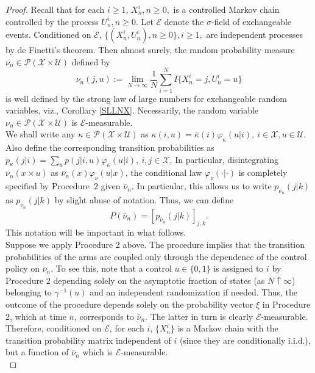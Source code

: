 \documentclass[10pt,a4paper]{amsart}
\newcommand{\E}{\mathcal{E}}
\newcommand{\PA}{\mathcal{P}}
\newcommand{\U}{\mathcal{U}}
\newcommand{\X}{\mathcal{X}}
\begin{document}
\begin{proof}
Recall that for each $i \geq 1$, $X^i_n, n \geq 0,$ is a controlled Markov chain controlled by the process $U^i_n, n \geq 0$.
Let $\E$ denote the $\sigma$-field of exchangeable events. Conditioned on $\E$,  $\{(X^i_n, U^i_n), n \geq 0\}, i \geq 1,$ are independent processes by de Finetti's theorem. Then almost surely,  the random probability measure $\nu_n \in \PA(\X\times\U)$ defined by
$$\nu_n(j,u) := \lim_{N\to\infty}\frac{1}{N}\sum_{i=1}^NI\{X^i_n=j, U^i_n = u\}$$
is well defined by the strong law of large numbers for exchangeable random variables, viz., Corollary \ref{SLLNX}. 
Necessarily, the random variable $\nu_n \in \PA(\X\times\U)$ is $\E$-measurable. \\

We shall write any $\kappa \in \PA(\X\times\U)$ as
$\kappa(i,u) = \bar{\kappa}(i)\varphi_\kappa(u|i) , \ i\in \X, u \in \U.$ Also define the corresponding transition probabilities as $p_\kappa(j|i) = \sum_up(j|i,u)\varphi_\kappa(u|i), \ i,j \in \X.$ In particular, disintegrating $\nu_n(x\times u)$ as $\bar{\nu}_n(x)\varphi_\nu(u|x)$, the conditional law $\varphi_\nu( \cdot | \cdot)$ is completely specified by Procedure~2 given $\bar{\nu}_n$. In particular, this allows us to write $p_{\nu_n}(j|k)$ as $p_{\bar{\nu}_n}(j|k)$ by slight abuse of notation. 
Thus, we can define
\begin{equation}
P(\bar\nu_n)= [p_{\bar\nu_n}(j|k)]_{j,k}. \label{newnotation}
\end{equation}
This notation will be important in what follows.\\

Suppose we apply Procedure 2 above. 
The procedure implies that the transition probabilities of the arms are coupled only through the dependence of the control policy on $\bar{\nu}_n$. To see this, note that a control $u \in \{0,1\}$ is assigned to $i$ by Procedure 2 depending solely on the asymptotic fraction of states (as $N\uparrow\infty$) belonging to $\gamma^{-1}(u)$ and an independent randomization if needed. Thus, the outcome of the procedure depends solely on the probability vector $\xi$ in Procedure 2, which at time $n$, corresponds to $\bar{\nu}_n$. The latter in turn is clearly $\E$-measurable. Therefore, conditioned on $\E$, for each $i$, $\{X^i_n\}$ is a Markov chain with the transition probability matrix independent of $i$ (since they are conditionally i.i.d.), but a function of $\bar{\nu}_n$ which is $\E$-measurable. \\


\end{proof}
\end{document}
